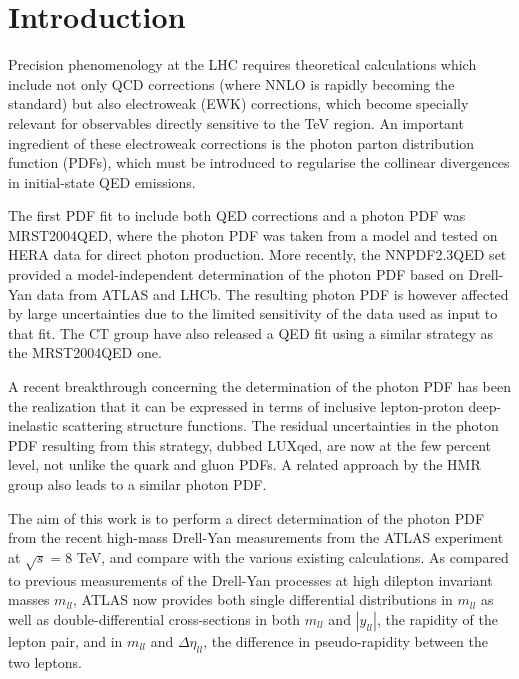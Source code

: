 \section{Introduction}

Precision phenomenology at the LHC requires theoretical calculations which
include not only QCD corrections (where NNLO is rapidly becoming
the standard) but also electroweak (EWK) corrections, which become
specially relevant for observables directly sensitive to the TeV region.
%
An important ingredient of these electroweak corrections is
the photon parton distribution function (PDFs), which must
be introduced
to regularise the collinear divergences in initial-state QED emissions.

The first PDF fit to include both QED corrections and a photon PDF
was MRST2004QED, where the photon PDF was taken from a model
and tested on HERA data for direct photon production.
%
More recently, the NNPDF2.3QED set provided a model-independent
determination of the photon PDF based on Drell-Yan data
from ATLAS and LHCb.
%
The resulting photon PDF is however affected by large uncertainties
due to the limited sensitivity of the data used as input to that
fit.
%
The CT group have also released a QED fit using a similar strategy
as the MRST2004QED one.

A recent breakthrough concerning the determination of the
photon PDF has been the realization that it can be expressed
in terms of inclusive lepton-proton deep-inelastic scattering
structure functions.
%
The residual uncertainties in the photon PDF resulting from
this strategy, dubbed LUXqed, are now at the few percent level,
not unlike the quark and gluon PDFs.
%
A related approach by the HMR group also leads to a similar
photon PDF.

The aim of this work is to perform a direct determination
of the photon PDF from the recent high-mass Drell-Yan measurements
from the ATLAS experiment at $\sqrt{s}=8$ TeV, and compare
with the various existing calculations.
%
As compared to previous measurements of the Drell-Yan processes
at high dilepton invariant masses $m_{ll}$, ATLAS now provides
both single differential distributions in $m_{ll}$ as well
as double-differential cross-sections in both $m_{ll}$
and $|y_{ll}|$, the rapidity of the lepton pair,
and in  $m_{ll}$ and $\Delta\eta_{ll}$, the difference in pseudo-rapidity
between the two leptons.

